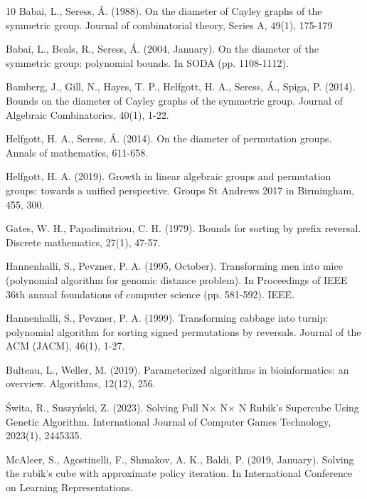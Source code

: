 \documentclass[reqno,11pt]{amsart}
\begin{document}
\begin{thebibliography}{10}
Babai, L.,  Seress, Á. (1988). On the diameter of Cayley graphs of the symmetric group. Journal of combinatorial theory, Series A, 49(1), 175-179

Babai, L., Beals, R.,  Seress, Á. (2004, January). On the diameter of the symmetric group: polynomial bounds. In SODA (pp. 1108-1112).


Bamberg, J., Gill, N., Hayes, T. P., Helfgott, H. A., Seress, Á.,  Spiga, P. (2014). Bounds on the diameter of Cayley graphs of the symmetric group. Journal of Algebraic Combinatorics, 40(1), 1-22.

Helfgott, H. A., Seress, Á. (2014). On the diameter of permutation groups. Annals of mathematics, 611-658.

Helfgott, H. A. (2019). Growth in linear algebraic groups and permutation groups: towards a unified perspective. Groups St Andrews 2017 in Birmingham, 455, 300.


Gates, W. H., Papadimitriou, C. H. (1979). Bounds for sorting by prefix reversal. Discrete mathematics, 27(1), 47-57.

Hannenhalli, S., Pevzner, P. A. (1995, October). Transforming men into mice (polynomial algorithm for genomic distance problem). In Proceedings of IEEE 36th annual foundations of computer science (pp. 581-592). IEEE.

Hannenhalli, S.,  Pevzner, P. A. (1999). Transforming cabbage into turnip: polynomial algorithm for sorting signed permutations by reversals. Journal of the ACM (JACM), 46(1), 1-27.


Bulteau, L.,  Weller, M. (2019). Parameterized algorithms in bioinformatics: an overview. Algorithms, 12(12), 256.

Świta, R.,  Suszyński, Z. (2023). Solving Full N× N× N Rubik’s Supercube Using Genetic Algorithm. International Journal of Computer Games Technology, 2023(1), 2445335.

McAleer, S., Agostinelli, F., Shmakov, A. K.,  Baldi, P. (2019, January). Solving the rubik's cube with approximate policy iteration. In International Conference on Learning Representations.


\end{thebibliography}
\end{document}
